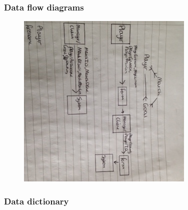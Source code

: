 \subsubsection{Data flow diagrams}
\begin{figure}[H]
	\includegraphics{dataflow}
\end{figure}

\subsubsection{Data dictionary}

